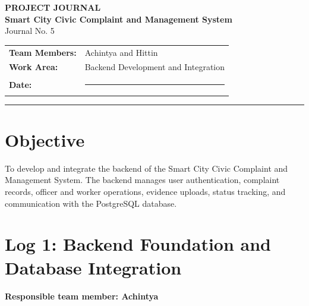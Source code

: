 \documentclass[12pt,a4paper]{article}
\begin{document}
\begin{center}
    {\Large\bfseries\color{navy} PROJECT JOURNAL}\\[5pt]
    {\large\bfseries Smart City Civic Complaint and Management System}\\[5pt]
    {\large Journal No. 5}\\[8pt]
    \begin{tabularx}{0.9\textwidth}{>{\bfseries}l X}
        Team Members: & Achintya and Hittin \\
        Work Area: & Backend Development and Integration \\
        Date: & \rule{0.65\textwidth}{0.4pt}
    \end{tabularx}
\end{center}

\vspace{5pt}
\hrule
\vspace{8pt}

\section{Objective}
To develop and integrate the backend of the Smart City Civic Complaint and Management System. The backend manages user authentication, complaint records, officer and worker operations, evidence uploads, status tracking, and communication with the PostgreSQL database.

\section{Log 1: Backend Foundation and Database Integration}
\textbf{Responsible team member: Achintya}
\end{document}
